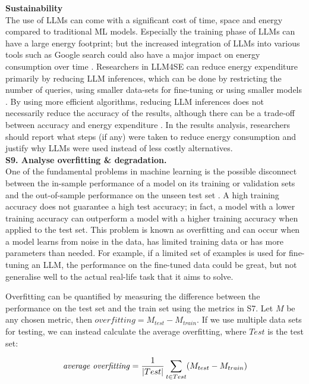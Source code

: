 \documentclass[a4paper]{article}
\begin{document}
\textbf{Sustainability}\\
The use of LLMs can come with a significant cost of time, space and energy compared to traditional ML models. Especially the training phase of LLMs can have a large energy footprint; but the increased integration of LLMs into various tools such as Google search could also have a major impact on energy consumption over time \cite{wu2022sustainableai,deVries2023}. Researchers in LLM4SE can reduce energy expenditure primarily by reducing LLM inferences, which can be done by restricting the number of queries, using smaller data-sets for fine-tuning or using smaller models \cite{baltes2025guidelinesempiricalstudiessoftware}. By using more efficient algorithms, reducing LLM inferences does not necessarily reduce the accuracy of the results, although there can be a trade-off between accuracy and energy expenditure \cite{deVries2023}. In the results analysis, researchers should report what steps (if any) were taken to reduce energy consumption and justify why LLMs were used instead of less costly alternatives.\\

\textbf{S9. Analyse overfitting \& degradation.}\\
One of the fundamental problems in machine learning is the possible disconnect between the in-sample performance of a model on its training or validation sets and the out-of-sample performance on the unseen test set \cite{Ying2019overfitting}. A high training accuracy does not guarantee a high test accuracy; in fact, a model with a lower training accuracy can outperform a model with a higher training accuracy when applied to the test set. This problem is known as overfitting and can occur when a model learns from noise in the data, has limited training data or has more parameters than needed. For example, if a limited set of examples is used for fine-tuning an LLM, the performance on the fine-tuned data could be great, but not generalise well to the actual real-life task that it aims to solve. 

Overfitting can be quantified by measuring the difference between the performance on the test set and the train set using the metrics in S7. Let $M$ be any chosen metric, then $overfitting = M_{test} - M_{train}$. If we use multiple data sets for testing, we can instead calculate the average overfitting, where $Test$ is the test set:

\begin{equation}
	\text{\textit{average overfitting}} = \frac{1}{|Test|} \sum_{t\in Test} (M_{test} - M_{train})
\label{overfitting}
\end{equation}
\end{document}
